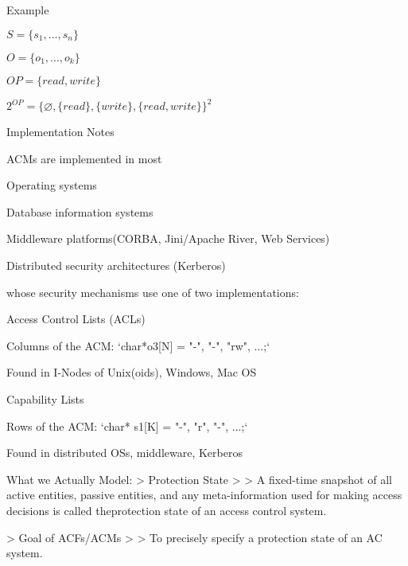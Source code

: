 \documentclass[a4paper]{article}
\begin{document}
\begin{multicols}{3}
    Example
    \begin{itemize*}
        \item $S=\{s_1 ,...,s_n\}$
        \item $O=\{o_1 ,...,o_k\}$
        \item $OP=\{read,write\}$
        \item $2^{OP}=\{\varnothing,\{read\},\{write\},\{read,write\}\}^2$
    \end{itemize*}

    Implementation Notes
    \begin{itemize*}
        \item ACMs are implemented in most
              \begin{itemize*}
                  \item Operating systems
                  \item Database information systems
                  \item Middleware platforms(CORBA, Jini/Apache River, Web Services)
                  \item Distributed security architectures (Kerberos)
              \end{itemize*}
        \item whose security mechanisms use one of two implementations:
    \end{itemize*}

    Access Control Lists (ACLs)
    \begin{itemize*}
        \item Columns of the ACM: `char*o3[N] = { "-", "-", "rw", ...};`
        \item Found in I-Nodes of Unix(oids), Windows, Mac OS
    \end{itemize*}

    Capability Lists
    \begin{itemize*}
        \item Rows of the ACM: `char* s1[K] = { "-", "r", "-", ...};`
        \item Found in distributed OSs, middleware, Kerberos
    \end{itemize*}

    What we Actually Model:
    > Protection State
    >
    > A fixed-time snapshot of all active entities, passive entities, and any meta-information used for making access decisions is called theprotection state of an access control system.

    > Goal of ACFs/ACMs
    >
    > To precisely specify a protection state of an AC system.


\end{multicols}
\end{document}

